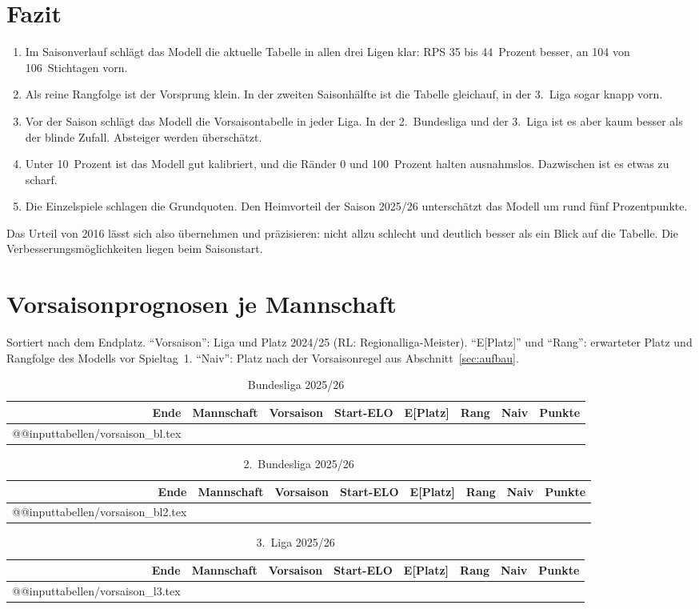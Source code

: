 \documentclass[11pt,a4paper,parskip=half,numbers=noenddot]{scrartcl}
\begin{document}
\section{Fazit}

\begin{merke}
\begin{enumerate}[leftmargin=*,itemsep=1pt]
  \item Im Saisonverlauf schlägt das Modell die aktuelle Tabelle in allen
        drei Ligen klar: RPS 35 bis 44~Prozent besser, an 104 von
        106~Stichtagen vorn.
  \item Als reine Rangfolge ist der Vorsprung klein. In der zweiten
        Saisonhälfte ist die Tabelle gleichauf, in der 3.~Liga sogar knapp
        vorn.
  \item Vor der Saison schlägt das Modell die Vorsaisontabelle in jeder Liga.
        In der 2.~Bundesliga und der 3.~Liga ist es aber kaum besser als
        der blinde Zufall. Absteiger werden überschätzt.
  \item Unter 10~Prozent ist das Modell gut kalibriert, und die Ränder 0 und
        100~Prozent halten ausnahmslos. Dazwischen ist es etwas zu scharf.
  \item Die Einzelspiele schlagen die Grundquoten. Den Heimvorteil der
        Saison 2025/26 unterschätzt das Modell um rund fünf Prozentpunkte.
\end{enumerate}
\end{merke}

Das Urteil von 2016 lässt sich also übernehmen und präzisieren: nicht allzu
schlecht und deutlich besser als ein Blick auf die Tabelle. Die
Verbesserungsmöglichkeiten liegen beim Saisonstart.

\appendix
\section{Vorsaisonprognosen je Mannschaft}\label{anh:teams}

Sortiert nach dem Endplatz. \enquote{Vorsaison}: Liga und Platz 2024/25 (RL:
Regionalliga-Meister). \enquote{E[Platz]} und \enquote{Rang}: erwarteter Platz
und Rangfolge des Modells vor Spieltag~1. \enquote{Naiv}: Platz nach der
Vorsaisonregel aus Abschnitt~\ref{sec:aufbau}.

\newcommand{\teamtab}[2]{%
\begin{table}[!htbp]\centering\small
\caption{#1}
\begin{tabular}{@{}rl l r r r r r@{}}
\toprule
Ende & Mannschaft & Vorsaison & Start-ELO & E[Platz] & Rang & Naiv & Punkte \\
\midrule
\csname @@input\endcsname tabellen/#2.tex 
\bottomrule
\end{tabular}
\end{table}}
\teamtab{Bundesliga 2025/26}{vorsaison_bl}
\teamtab{2.~Bundesliga 2025/26}{vorsaison_bl2}
\teamtab{3.~Liga 2025/26}{vorsaison_l3}
\end{document}
